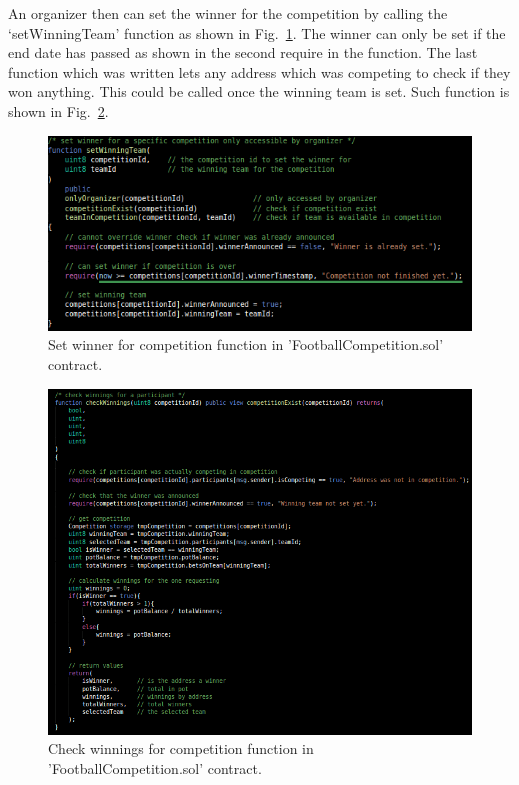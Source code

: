 \noindent
An organizer then can set the winner for the competition by calling the ‘setWinningTeam’ function as shown in Fig.~\ref{fig:comp_sol_10}. The winner can only be set if the end date has passed as shown in the second require in the function. The last function which was written lets any address which was competing to check if they won anything. This could be called once the winning team is set. Such function is shown in Fig.~\ref{fig:comp_sol_11}.

\begin{figure}[H]
\centering
  \includegraphics[scale = .7]{imgs/comp_sol_10.png}
  \caption{Set winner for competition function in 'FootballCompetition.sol' contract.}
  \label{fig:comp_sol_10}
\end{figure}

\begin{figure}[H]
\centering
  \includegraphics[scale = .6]{imgs/comp_sol_11.png}
  \caption{Check winnings for competition function in 'FootballCompetition.sol' contract.}
  \label{fig:comp_sol_11}
\end{figure}

